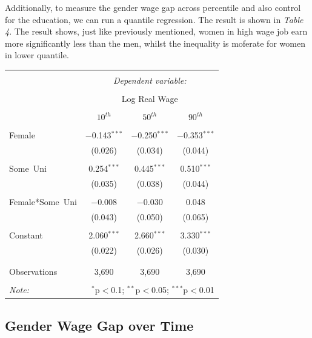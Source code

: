 \documentclass{article}
\begin{document}
Additionally, to measure the gender wage gap across percentile and also control for the education, we can run a quantile regression. The result is shown in \textit{Table 4}. The result shows, just like previously mentioned, women in high wage job earn more significantly less than the men, whilst the inequality is moferate for women in lower quantile.
\begin{table}[!htbp] \centering 
\captionsetup{labelfont=bf}
\label{tab:title} 
\begin{tabular}{@{\extracolsep{5pt}}lccc} 
\\[-1.8ex]\hline 
\hline \\[-1.8ex] 
 & \multicolumn{3}{c}{\textit{Dependent variable:}} \\ 
\cline{2-4} 
\\[-1.8ex] & \multicolumn{3}{c}{Log Real Wage} \\ 
\\[-1.8ex] & $10^{th}$ & $50^{th}$ & $90^{th}$\\ 
\hline \\[-1.8ex] 
 Female & $-$0.143$^{***}$ & $-$0.250$^{***}$ & $-$0.353$^{***}$ \\ 
  & (0.026) & (0.034) & (0.044) \\ 
  & & & \\ 
 Some\ Uni & 0.254$^{***}$ & 0.445$^{***}$ & 0.510$^{***}$ \\ 
  & (0.035) & (0.038) & (0.044) \\ 
  & & & \\ 
 Female*Some\ Uni & $-$0.008 & $-$0.030 & 0.048 \\ 
  & (0.043) & (0.050) & (0.065) \\ 
  & & & \\ 
 Constant & 2.060$^{***}$ & 2.660$^{***}$ & 3.330$^{***}$ \\ 
  & (0.022) & (0.026) & (0.030) \\ 
  & & & \\ 
\hline \\[-1.8ex] 
Observations & 3,690 & 3,690 & 3,690 \\ 
\hline 
\hline \\[-1.8ex] 
\textit{Note:}  & \multicolumn{3}{r}{$^{*}$p$<$0.1; $^{**}$p$<$0.05; $^{***}$p$<$0.01} \\ 
\end{tabular} 
\end{table}

\subsection{Gender Wage Gap over Time}
\end{document}

